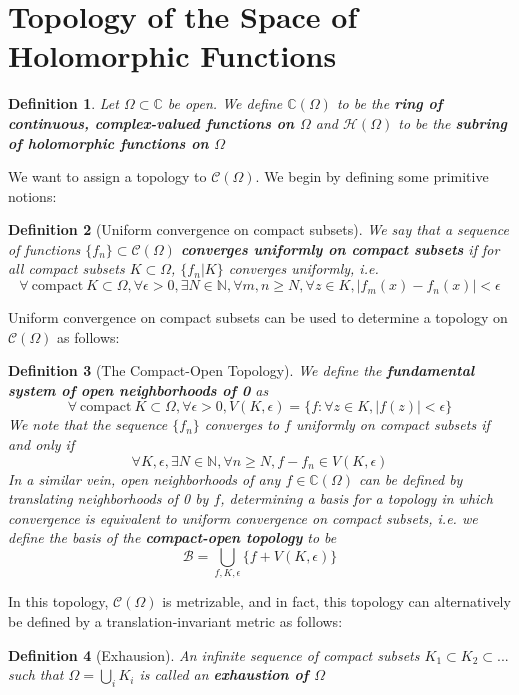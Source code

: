 \documentclass{article}
\newcommand{\mbb}[1]{\mathbb{#1}}
\newcommand{\mc}[1]{\mathcal{#1}}
\newtheorem{definition}{Definition}
\begin{document}
\section{Topology of the Space of Holomorphic Functions}

\begin{definition}
Let \(\Omega \subset \mbb{C}\) be open. We define \(\mbb{C}(\Omega)\) to be the \textbf{ring of continuous, complex-valued functions on \(\Omega\)} and \(\mc{H}(\Omega)\) to be the \textbf{subring of holomorphic functions on \(\Omega\)}
\end{definition}
We want to assign a topology to \(\mc{C}(\Omega)\). We begin by defining some primitive notions:
\begin{definition}[Uniform convergence on compact subsets]
We say that a sequence of functions \(\{f_n\} \subset \mc{C}(\Omega)\) \textbf{converges uniformly on compact subsets} if for all compact subsets \(K \subset \Omega\), \(\{f_n | K\}\) converges uniformly, i.e.
\[\forall \ \text{compact} \ K \subset \Omega, \forall \epsilon > 0, \exists N \in \mbb{N}, \forall m, n \geq N, \forall z \in K, |f_m(x) - f_n(x)| < \epsilon\]
\end{definition}
Uniform convergence on compact subsets can be used to determine a topology on \(\mc{C}(\Omega)\) as follows:
\begin{definition}[The Compact-Open Topology]
We define the \textbf{fundamental system of open neighborhoods of 0} as
\[\forall \ \text{compact} \ K \subset \Omega, \forall \epsilon > 0, V(K, \epsilon) = \{f: \forall z \in K, |f(z)| < \epsilon\}\]
We note that the sequence \(\{f_n\}\) converges to \(f\) uniformly on compact subsets if and only if
\[\forall K, \epsilon, \exists N \in \mbb{N}, \forall n \geq N, f - f_n \in V(K, \epsilon)\]
In a similar vein, open neighborhoods of any \(f \in \mbb{C}(\Omega)\) can be defined by translating neighborhoods of 0 by \(f\), determining a basis for a topology in which convergence is equivalent to uniform convergence on compact subsets, i.e. we define the basis of the \textbf{compact-open topology} to be
\[\mc{B} = \bigcup_{f, K, \epsilon}\{f + V(K, \epsilon)\}\]
\end{definition}
In this topology, \(\mc{C}(\Omega)\) is metrizable, and in fact, this topology can alternatively be defined by a translation-invariant metric as follows:
\begin{definition}[Exhausion]
An infinite sequence of compact subsets \(K_1 \subset K_2 \subset ...\) such that \(\Omega = \bigcup_i K_i\) is called an \textbf{exhaustion of \(\Omega\)}
\end{definition}
\end{document}
